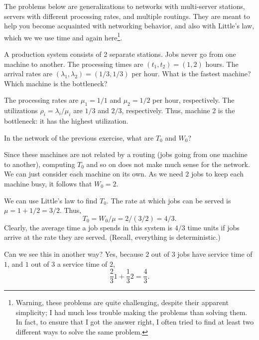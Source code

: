 The problems below are generalizations to networks with multi-server
stations, servers with different processing rates, and multiple
routings. They are meant to help you become acquainted with networking
behavior, and also with Little's law, which we we use time and again
here\footnote{Warning, these problems are quite challenging, despite their apparent simplicity; I had much less trouble making the problems than solving them. In fact, to ensure that
I got the answer right, I often tried to find at least two different ways to
solve the same problem.}.

\begin{exercise}
  A production system consists of 2 separate stations. Jobs never go
  from one machine to another. The processing times are
  $(t_1, t_2) = (1, 2)$ hours. The arrival rates are
  $(\lambda_1, \lambda_2) = (1/3, 1/3)$ per hour. What is the fastest
  machine? Which machine is the bottleneck? 
  \begin{solution}
    The processing rates are $\mu_1=1/1$ and $\mu_2 = 1/2$ per hour,
    respectively. The utilizations $\rho_i=\lambda_i/\mu_i$ are $1/3$
    and $2/3$, respectively. Thus, machine 2 is the bottleneck: it has
    the highest utilization.
  \end{solution}
\end{exercise}

\begin{exercise}
In the network of the previous exercise, what are $T_0$ and $W_0$? 
  \begin{solution}
Since these machines are not related by a routing (jobs going from
    one machine to another), computing $T_0$ and so on does not make
    much sense for the network. We can just consider each machine on
    its own. As we need $2$ jobs to keep each machine busy, it
    follows that $W_0=2$. 

We can use Little's law to find $T_0$. The rate at which jobs can be served is $\mu = 1+1/2 = 3/2$. Thus, 
\begin{equation*}
  T_0 = W_0/\mu = 2/(3/2)=4/3.
\end{equation*}
Clearly, the average time a job spends in this system is $4/3$ time units
if jobs arrive at the rate they are served. (Recall, everything is
deterministic.)

Can we see this in another way? Yes, because $2$ out of $3$ jobs have service time of $1$, and $1$ out of $3$ a service time of $2$,
\begin{equation*}
  \frac23 1 + \frac 1 3 2 = \frac 4 3.
\end{equation*}
  \end{solution}
\end{exercise}



